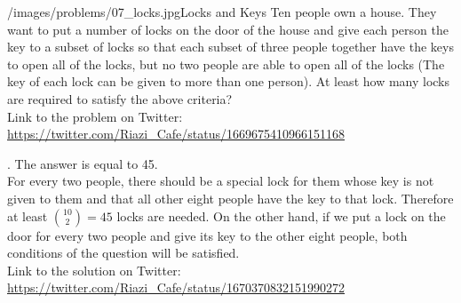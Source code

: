 \begin{problem}{/images/problems/07_locks.jpg}{Locks and Keys} 
    Ten people own a house. They want to put a number of locks on the door of the house and give each person the key to a subset of locks so that each subset of three people together have the keys to open all of the locks, but no two people are able to open all of the locks (The key of each lock can be given to more than one person).  At least how many locks are required to satisfy the above criteria?\\[0.2cm]

Link to the problem on Twitter:  \url{https://twitter.com/Riazi_Cafe/status/1669675410966151168}
\end{problem}
\begin{solution}.
The answer is equal to 45.\\[0.2cm]

For every two people, there should be a special lock for them whose key is not given to them and that all other eight people have the key to that lock. Therefore at least $\binom{10}{2} = 45$ locks are needed. On the other hand, if we put a lock on the door for every two people and give its key to the other eight people, both conditions of the question will be satisfied. \\[0.2cm]

Link to the solution on Twitter:  \url{https://twitter.com/Riazi_Cafe/status/1670370832151990272}
\end{solution}